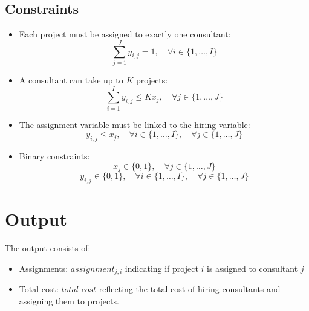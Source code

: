 \documentclass{article}
\begin{document}
\subsection*{Constraints}
\begin{itemize}
    \item Each project must be assigned to exactly one consultant:
    \[
    \sum_{j=1}^{J} y_{i,j} = 1, \quad \forall i \in \{1, \ldots, I\}
    \]
    
    \item A consultant can take up to $K$ projects:
    \[
    \sum_{i=1}^{I} y_{i,j} \leq K x_j, \quad \forall j \in \{1, \ldots, J\}
    \]

    \item The assignment variable must be linked to the hiring variable:
    \[
    y_{i,j} \leq x_j, \quad \forall i \in \{1, \ldots, I\}, \quad \forall j \in \{1, \ldots, J\}
    \]

    \item Binary constraints:
    \[
    x_j \in \{0, 1\}, \quad \forall j \in \{1, \ldots, J\}
    \]
    \[
    y_{i,j} \in \{0, 1\}, \quad \forall i \in \{1, \ldots, I\}, \quad \forall j \in \{1, \ldots, J\}
    \]
\end{itemize}

\section*{Output}
The output consists of:
\begin{itemize}
    \item Assignments: $assignment_{j,i}$ indicating if project $i$ is assigned to consultant $j$
    \item Total cost: $total\_cost$ reflecting the total cost of hiring consultants and assigning them to projects.
\end{itemize}
\end{document}
